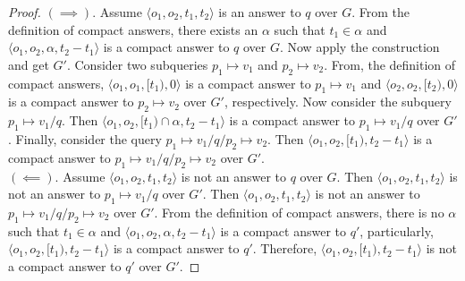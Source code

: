 \begin{proof}
\noindent $(\implies)$. Assume $\langle o_1,o_2,t_1,t_2
\rangle$ is an answer to $q$ over $G$. From the definition of compact answers, there
exists an $\alpha$ such that $t_1 \in \alpha$ and $\langle
o_1,o_2,\alpha,t_2-t_1 \rangle$ is a compact answer to $q$ over $G$. Now apply
the construction and get $G'$. Consider two subqueries $p_1 \mapsto v_1$ and $p_2 \mapsto v_2$. From, the definition of compact answers,
$\langle o_1,o_1,[t_1),0 \rangle$ is a compact answer to $p_1 \mapsto v_1$ and $\langle
o_2,o_2,[t_2),0 \rangle$ is a compact answer to $p_2 \mapsto v_2$ over $G'$, respectively. Now consider the subquery $p_1 \mapsto v_1/q$. Then
$\langle o_1,o_2,[t_1) \cap \alpha,t_2-t_1 \rangle$ is a compact answer to $p_1
\mapsto v_1/q$ over $G'$. Finally, consider the query $p_1 \mapsto v_1/q/p_2 \mapsto v_2$. Then $\langle o_1,o_2,[t_1),t_2-t_1 \rangle$ is a compact
answer to $p_1 \mapsto v_1/q/p_2 \mapsto v_2$ over $G'$. \\



\noindent $ (\impliedby) $. Assume $\langle o_1,o_2,t_1,t_2 \rangle$ is not an
answer to $q$ over $G$. Then $\langle o_1,o_2,t_1,t_2 \rangle$ is not an answer
to $p_1 \mapsto v_1/q$ over $G'$. Then $\langle o_1,o_2,t_1,t_2 \rangle$ is not
an answer to $p_1 \mapsto v_1/q/p_2 \mapsto v_2$ over $G'$. From the definition of compact answers, there is no
$\alpha$ such that $t_1 \in \alpha$ and $\langle o_1,o_2,\alpha,t_2-t_1
\rangle$ is a compact answer to $q'$, particularly, $\langle o_1,o_2,[t_1),t_2-t_1 \rangle$ is a compact answer to $q'$. Therefore, $\langle o_1,o_2,[t_1),t_2-t_1 \rangle$ is not a compact answer to $q'$ over $G'$.

\end{proof}




